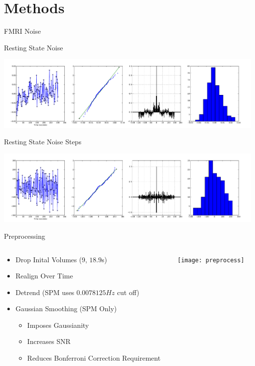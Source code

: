 \documentclass{beamer}
\begin{document}
\section{Methods}
\begin{frame}{FMRI Noise}
\centering

Resting State Noise

\includegraphics[trim=3cm 0cm 3cm 0cm,width=.75\textwidth]{noise2_0009_22_38_23}

Resting State Noise Steps

\includegraphics[trim=3cm 0cm 3cm 0cm,width=.75\textwidth]{noise2_0009d_22_38_23}

\end{frame}

\begin{frame}{Preprocessing}
  \begin{columns}
    \begin{column}{.6\textwidth}
        \begin{itemize}
            \item Drop Inital Volumes (9, $18.9$s)
            \item Realign Over Time
            \item Detrend (SPM uses $0.0078125 Hz$ cut off)
            \item Gaussian Smoothing (SPM Only)
            \begin{itemize}
                \item Imposes Gaussianity
                \item Increases SNR
                \item Reduces Bonferroni Correction Requirement
            \end{itemize}
        \end{itemize}
    \end{column}
    
    \begin{column}{.4\textwidth}
        \texttt{[image: preprocess]}
    \end{column}
  \end{columns}
\end{frame}
\end{document}
